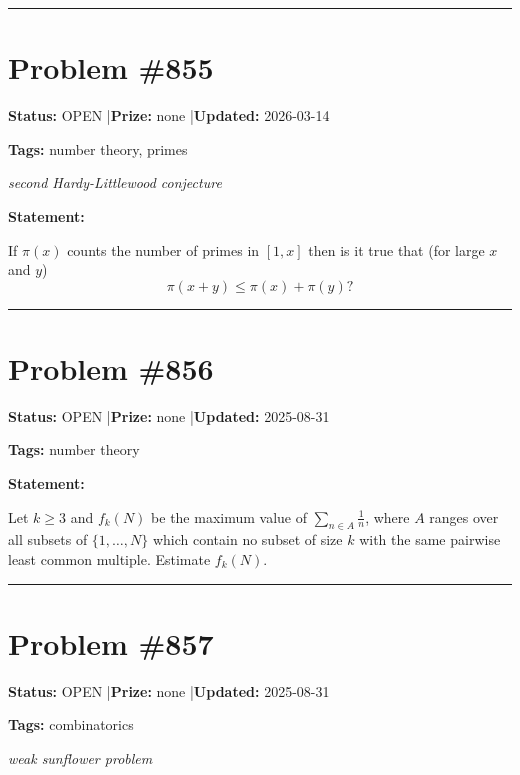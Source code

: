 \documentclass{article}
\begin{document}
\noindent\rule{\linewidth}{0.4pt}


\section{Problem \#855}
\label{prob:855}

\noindent\textbf{Status:} OPEN \quad|\quad \textbf{Prize:} none \quad|\quad \textbf{Updated:} 2026-03-14

\noindent\textbf{Tags:} number theory, primes

\medskip
\noindent\textit{second Hardy-Littlewood conjecture}


\noindent\textbf{Statement:}

If $\pi(x)$ counts the number of primes in $[1,x]$ then is it true that (for large $x$ and $y$)\[\pi(x+y) \leq \pi(x)+\pi(y)?\]

\noindent\rule{\linewidth}{0.4pt}


\section{Problem \#856}
\label{prob:856}

\noindent\textbf{Status:} OPEN \quad|\quad \textbf{Prize:} none \quad|\quad \textbf{Updated:} 2025-08-31

\noindent\textbf{Tags:} number theory

\medskip

\noindent\textbf{Statement:}

Let $k\geq 3$ and $f_k(N)$ be the maximum value of $\sum_{n\in A}\frac{1}{n}$, where $A$ ranges over all subsets of $\{1,\ldots,N\}$ which contain no subset of size $k$ with the same pairwise least common multiple. Estimate $f_k(N)$.

\noindent\rule{\linewidth}{0.4pt}


\section{Problem \#857}
\label{prob:857}

\noindent\textbf{Status:} OPEN \quad|\quad \textbf{Prize:} none \quad|\quad \textbf{Updated:} 2025-08-31

\noindent\textbf{Tags:} combinatorics

\medskip
\noindent\textit{weak sunflower problem}
\end{document}
